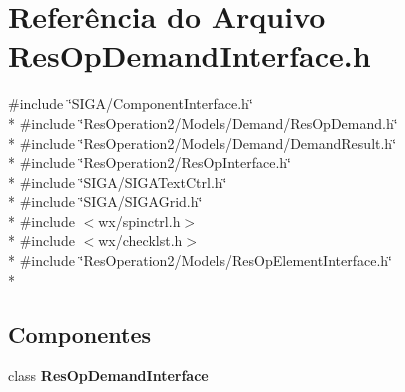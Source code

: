 \section{Referência do Arquivo Res\+Op\+Demand\+Interface.\+h}
\label{_res_op_demand_interface_8h}
{\ttfamily \#include \char`\"{}S\+I\+G\+A/\+Component\+Interface.\+h\char`\"{}}\\*
{\ttfamily \#include \char`\"{}Res\+Operation2/\+Models/\+Demand/\+Res\+Op\+Demand.\+h\char`\"{}}\\*
{\ttfamily \#include \char`\"{}Res\+Operation2/\+Models/\+Demand/\+Demand\+Result.\+h\char`\"{}}\\*
{\ttfamily \#include \char`\"{}Res\+Operation2/\+Res\+Op\+Interface.\+h\char`\"{}}\\*
{\ttfamily \#include \char`\"{}S\+I\+G\+A/\+S\+I\+G\+A\+Text\+Ctrl.\+h\char`\"{}}\\*
{\ttfamily \#include \char`\"{}S\+I\+G\+A/\+S\+I\+G\+A\+Grid.\+h\char`\"{}}\\*
{\ttfamily \#include $<$wx/spinctrl.\+h$>$}\\*
{\ttfamily \#include $<$wx/checklst.\+h$>$}\\*
{\ttfamily \#include \char`\"{}Res\+Operation2/\+Models/\+Res\+Op\+Element\+Interface.\+h\char`\"{}}\\*
\subsection*{Componentes}
\begin{DoxyCompactItemize}
\item 
class {\bf Res\+Op\+Demand\+Interface}
\end{DoxyCompactItemize}
